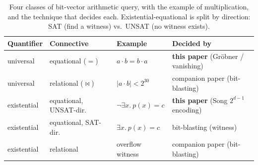 \documentclass[runningheads]{llncs}
\begin{document}
\begin{table}[ht]
\caption{Four classes of bit-vector arithmetic query, with the
example of multiplication, and the technique that decides each.
Existential-equational is split by direction: SAT (find a
witness) vs.\ UNSAT (no witness exists).}
\label{tab:taxonomy}
\centering
\small
\begin{tabular}{llll}
\toprule
Quantifier & Connective & Example & Decided by \\
\midrule
universal   & equational ($=$)        & $a \cdot b = b \cdot a$    & \textbf{this paper} (Gr\"obner / vanishing) \\
universal   & relational ($\bowtie$)  & $|a \cdot b| < 2^{30}$     & companion paper (bit-blasting) \\
existential & equational, UNSAT-dir.  & $\neg \exists x.\ p(x) = c$ & \textbf{this paper} (Song $2^{d-1}$ encoding) \\
existential & equational, SAT-dir.    & $\exists x.\ p(x) = c$     & bit-blasting (witness) \\
existential & relational              & overflow witness           & companion paper (bit-blasting) \\
\bottomrule
\end{tabular}
\end{table}
\end{document}
